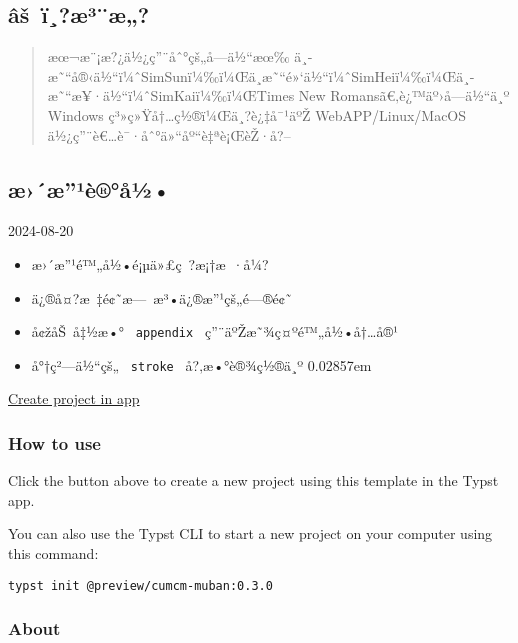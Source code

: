 \subsection{âš~ï¸?æ³¨æ„?}\label{uxe2ux161-uxefuxe6uxb3uxe6}

\begin{quote}
æœ¬æ¨¡æ?¿ä½¿ç''¨åˆ°çš„å­---ä½``æœ‰
ä¸­æ˜``å®‹ä½``ï¼ˆSimSunï¼‰ï¼Œä¸­æ˜``é»`ä½``ï¼ˆSimHeiï¼‰ï¼Œä¸­æ˜``æ¥·ä½``ï¼ˆSimKaiï¼‰ï¼ŒTimes
New Romansã€‚è¿™äº›å­---ä½``ä¸º Windows ç³»ç»Ÿå†\ldots ç½®ï¼Œä¸?è¿‡å¯¹äºŽ
WebAPP/Linux/MacOS ä½¿ç''¨è€\ldots è¯·åˆ°ä»``åº``è‡ªè¡ŒèŽ·å?--
\end{quote}

\subsection{æ›´æ''¹è®°å½•}\label{uxe6uxe6uxb9uxe8uxe5uxbd}

2024-08-20

\begin{itemize}
\tightlist
\item
  æ›´æ''¹é™„å½•é¡µä»£ç~?æ¡†æ~·å¼?
\item
  ä¿®å¤?æ~‡é¢˜æ---~æ³•ä¿®æ''¹çš„é---®é¢˜
\item
  å¢žåŠ~å‡½æ•° \texttt{\ appendix\ } ç''¨äºŽæ˜¾ç¤ºé™„å½•å†\ldots å®¹
\item
  å°†ç²---ä½``çš„ \texttt{\ stroke\ } å?‚æ•°è®¾ç½®ä¸º 0.02857em
\end{itemize}

\href{/app?template=cumcm-muban&version=0.3.0}{Create project in app}

\subsubsection{How to use}\label{how-to-use}

Click the button above to create a new project using this template in
the Typst app.

You can also use the Typst CLI to start a new project on your computer
using this command:

\begin{verbatim}
typst init @preview/cumcm-muban:0.3.0
\end{verbatim}



\subsubsection{About}\label{about}

